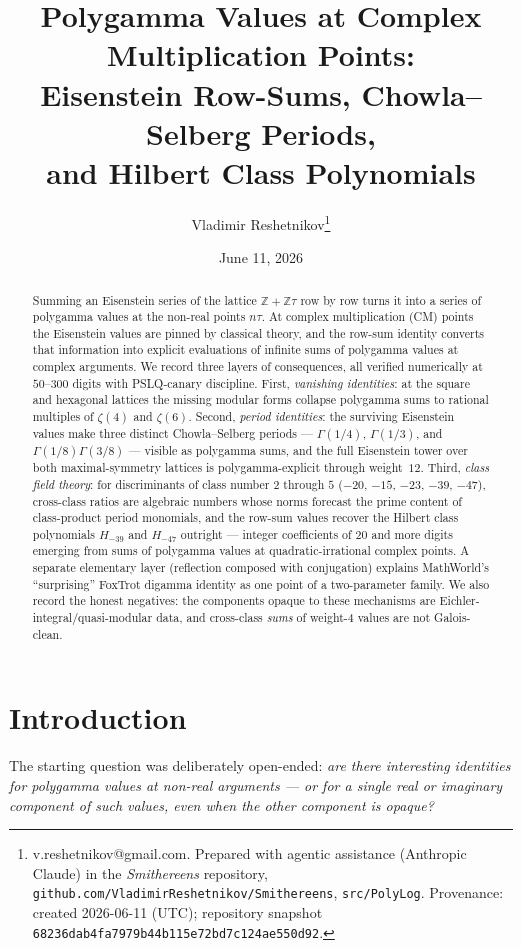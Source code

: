 \documentclass[11pt]{article}
\title{Polygamma Values at Complex Multiplication Points:\\
Eisenstein Row-Sums, Chowla--Selberg Periods,\\ and Hilbert Class Polynomials}
\author{Vladimir Reshetnikov\thanks{%
v.reshetnikov@gmail.com. Prepared with agentic assistance (Anthropic Claude) in the
\emph{Smithereens} repository,
\texttt{github.com/VladimirReshetnikov/Smithereens}, \texttt{src/PolyLog}.
Provenance: created 2026-06-11 (UTC); repository snapshot
\texttt{68236dab4fa7979b44b115e72bd7c124ae550d92}.}}
\date{June 11, 2026}
\theoremstyle{remark}
\begin{document}
\maketitle

\begin{abstract}
Summing an Eisenstein series of the lattice $\mathbb{Z}+\mathbb{Z}\tau$ row by row turns it
into a series of polygamma values at the non-real points $n\tau$. At complex multiplication
(CM) points the Eisenstein values are pinned by classical theory, and the row-sum identity
converts that information into explicit evaluations of infinite sums of polygamma values at
complex arguments. We record three layers of consequences, all verified numerically at
$50$--$300$ digits with PSLQ-canary discipline. First, \emph{vanishing identities}: at the
square and hexagonal lattices the missing modular forms collapse polygamma sums to rational
multiples of $\zeta(4)$ and $\zeta(6)$. Second, \emph{period identities}: the surviving
Eisenstein values make three distinct Chowla--Selberg periods --- $\Gamma(1/4)$, $\Gamma(1/3)$,
and $\Gamma(1/8)\Gamma(3/8)$ --- visible as polygamma sums, and the full Eisenstein tower over
both maximal-symmetry lattices is polygamma-explicit through weight~$12$. Third, \emph{class
field theory}: for discriminants of class number $2$ through $5$ ($-20$, $-15$, $-23$, $-39$,
$-47$), cross-class ratios are algebraic numbers whose norms forecast the prime content of
class-product period monomials, and the row-sum values recover the Hilbert class polynomials
$H_{-39}$ and $H_{-47}$ outright --- integer coefficients of $20$ and more digits emerging from
sums of polygamma values at quadratic-irrational complex points. A separate elementary layer
(reflection composed with conjugation) explains MathWorld's ``surprising'' FoxTrot digamma
identity as one point of a two-parameter family. We also record the honest negatives: the
components opaque to these mechanisms are Eichler-integral/quasi-modular data, and
cross-class \emph{sums} of weight-$4$ values are not Galois-clean.
\end{abstract}

\section{Introduction}

The starting question was deliberately open-ended: \emph{are there interesting identities for
polygamma values at non-real arguments --- or for a single real or imaginary component of such
values, even when the other component is opaque?}
\end{document}
